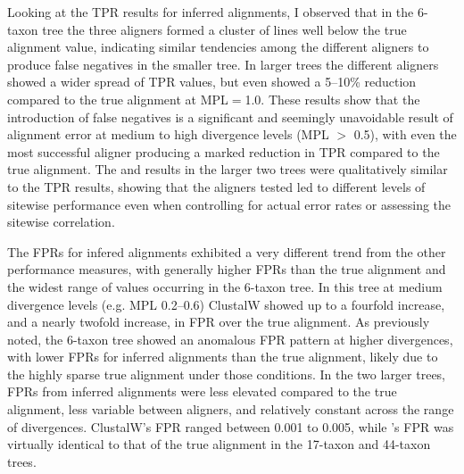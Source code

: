 Looking at the TPR results for inferred alignments, I observed that
in the 6-taxon tree the three aligners formed a cluster of lines well
below the true alignment value, indicating similar tendencies among
the different aligners to produce false negatives in the smaller
tree. In larger trees the different aligners showed a wider spread of
TPR values, but even \prankc{} showed a 5--10\% reduction compared to
the true alignment at MPL$=$1.0. These results show that the
introduction of false negatives is a significant and seemingly
unavoidable result of alignment error at medium to high divergence
levels (MPL $>$ 0.5), with even the most successful aligner producing
a marked reduction in TPR compared to the true alignment. The \tpr and
\omg results in the larger two trees were qualitatively similar to
the TPR results, showing that the aligners tested led to different
levels of sitewise performance even when controlling for actual error
rates or assessing the sitewise \omg correlation.

The FPRs for infered alignments exhibited a very different trend from
the other performance measures, with generally higher FPRs than the
true alignment and the widest range of values occurring in the 6-taxon
tree. In this tree at medium divergence levels (e.g. MPL 0.2--0.6)
ClustalW showed up to a fourfold increase, and \prankc{} a nearly
twofold increase, in FPR over the true alignment. As previously noted,
the 6-taxon tree showed an anomalous FPR pattern at higher
divergences, with lower FPRs for inferred alignments than the true
alignment, likely due to the highly sparse true alignment under those
conditions. In the two larger trees, FPRs from inferred alignments
were less elevated compared to the true alignment, less variable
between aligners, and relatively constant across the range of
divergences. ClustalW's FPR ranged between 0.001 to 0.005, while
\prankc{}'s FPR was virtually identical to that of the true alignment in the
17-taxon and 44-taxon trees.

